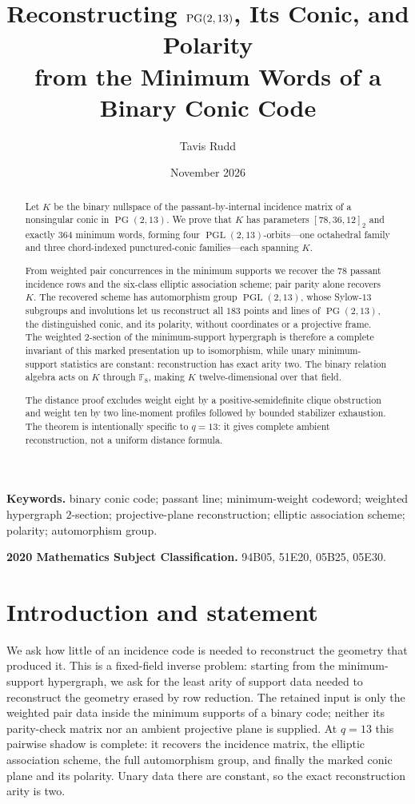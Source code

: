 \documentclass[11pt]{article}
\title{Reconstructing $\PG(2,13)$, Its Conic, and Polarity\\
from the Minimum Words of a Binary Conic Code}
\author{Tavis Rudd}
\date{November 2026}
\theoremstyle{definition}
\theoremstyle{remark}
\newcommand{\F}{\mathbb F}
\newcommand{\PG}{\operatorname{PG}}
\newcommand{\PGL}{\operatorname{PGL}}
\begin{document}
\maketitle

\begin{abstract}
Let \(K\) be the binary nullspace of the passant-by-internal
incidence matrix of a nonsingular conic in \(\PG(2,13)\).  We prove that
\(K\) has parameters \([78,36,12]_2\) and exactly \(364\) minimum words,
forming four \(\PGL(2,13)\)-orbits---one octahedral family and three
chord-indexed punctured-conic families---each spanning \(K\).

From weighted pair concurrences in the minimum supports we recover the \(78\)
passant incidence rows and the six-class elliptic association scheme; pair
parity alone recovers \(K\).  The recovered scheme has automorphism group
\(\PGL(2,13)\), whose Sylow-\(13\) subgroups and involutions let us
reconstruct all \(183\) points and lines of \(\PG(2,13)\), the distinguished
conic, and its polarity, without coordinates or a projective frame.  The
weighted \(2\)-section of the minimum-support hypergraph is therefore a
complete invariant of this marked presentation up to isomorphism, while
unary minimum-support statistics are constant: reconstruction has exact
arity two.  The
binary relation algebra acts on \(K\) through \(\F_8\), making \(K\)
twelve-dimensional over that field.

The distance proof excludes weight eight by a positive-semidefinite clique
obstruction and weight ten by two line-moment profiles followed by bounded
stabilizer
exhaustion.  The theorem is intentionally specific to \(q=13\): it gives
complete ambient reconstruction, not a uniform distance formula.
\end{abstract}

\noindent\textbf{Keywords.} binary conic code; passant line; minimum-weight
codeword; weighted hypergraph \(2\)-section; projective-plane reconstruction;
elliptic association scheme; polarity; automorphism group.

\smallskip
\noindent\textbf{2020 Mathematics Subject Classification.} 94B05, 51E20,
05B25, 05E30.

\section{Introduction and statement}

We ask how little of an incidence code is needed to reconstruct the geometry
that produced it.  This is a fixed-field inverse problem: starting from the
minimum-support hypergraph, we ask for the least arity of support data needed
to reconstruct the geometry erased by row reduction.  The retained input is
only the weighted pair data inside the minimum supports of a binary code;
neither its parity-check matrix nor an ambient projective plane is supplied.
At \(q=13\) this pairwise shadow is complete: it recovers the incidence
matrix, the elliptic association scheme, the full automorphism group, and
finally the marked conic plane and its polarity.  Unary data there are
constant, so the exact reconstruction arity is two.
\end{document}
